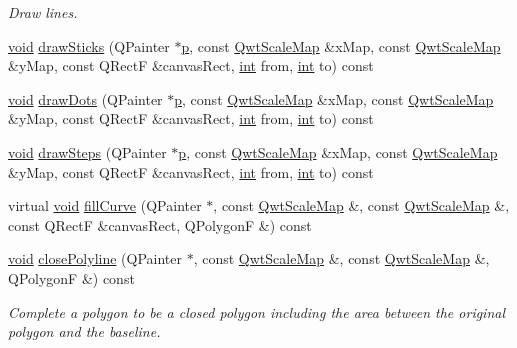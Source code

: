 \begin{DoxyCompactItemize}
\begin{DoxyCompactList}\small\item\em Draw lines. \end{DoxyCompactList}\item 
\hyperlink{group___u_a_v_objects_plugin_ga444cf2ff3f0ecbe028adce838d373f5c}{void} \hyperlink{class_qwt_plot_curve_a732c4a8b905be4f635d8558b6d959b52}{draw\-Sticks} (Q\-Painter $\ast$\hyperlink{glext_8h_aa5367c14d90f462230c2611b81b41d23}{p}, const \hyperlink{class_qwt_scale_map}{Qwt\-Scale\-Map} \&x\-Map, const \hyperlink{class_qwt_scale_map}{Qwt\-Scale\-Map} \&y\-Map, const Q\-Rect\-F \&canvas\-Rect, \hyperlink{ioapi_8h_a787fa3cf048117ba7123753c1e74fcd6}{int} from, \hyperlink{ioapi_8h_a787fa3cf048117ba7123753c1e74fcd6}{int} to) const 
\item 
\hyperlink{group___u_a_v_objects_plugin_ga444cf2ff3f0ecbe028adce838d373f5c}{void} \hyperlink{class_qwt_plot_curve_a9d5c81d3340aebf2ab8cf0dfee7e9c81}{draw\-Dots} (Q\-Painter $\ast$\hyperlink{glext_8h_aa5367c14d90f462230c2611b81b41d23}{p}, const \hyperlink{class_qwt_scale_map}{Qwt\-Scale\-Map} \&x\-Map, const \hyperlink{class_qwt_scale_map}{Qwt\-Scale\-Map} \&y\-Map, const Q\-Rect\-F \&canvas\-Rect, \hyperlink{ioapi_8h_a787fa3cf048117ba7123753c1e74fcd6}{int} from, \hyperlink{ioapi_8h_a787fa3cf048117ba7123753c1e74fcd6}{int} to) const 
\item 
\hyperlink{group___u_a_v_objects_plugin_ga444cf2ff3f0ecbe028adce838d373f5c}{void} \hyperlink{class_qwt_plot_curve_aa55bd22c153a15b7cba082c499536602}{draw\-Steps} (Q\-Painter $\ast$\hyperlink{glext_8h_aa5367c14d90f462230c2611b81b41d23}{p}, const \hyperlink{class_qwt_scale_map}{Qwt\-Scale\-Map} \&x\-Map, const \hyperlink{class_qwt_scale_map}{Qwt\-Scale\-Map} \&y\-Map, const Q\-Rect\-F \&canvas\-Rect, \hyperlink{ioapi_8h_a787fa3cf048117ba7123753c1e74fcd6}{int} from, \hyperlink{ioapi_8h_a787fa3cf048117ba7123753c1e74fcd6}{int} to) const 
\item 
virtual \hyperlink{group___u_a_v_objects_plugin_ga444cf2ff3f0ecbe028adce838d373f5c}{void} \hyperlink{class_qwt_plot_curve_a599d88770d6fafa5ae4edb75fd5d445f}{fill\-Curve} (Q\-Painter $\ast$, const \hyperlink{class_qwt_scale_map}{Qwt\-Scale\-Map} \&, const \hyperlink{class_qwt_scale_map}{Qwt\-Scale\-Map} \&, const Q\-Rect\-F \&canvas\-Rect, Q\-Polygon\-F \&) const 
\item 
\hyperlink{group___u_a_v_objects_plugin_ga444cf2ff3f0ecbe028adce838d373f5c}{void} \hyperlink{class_qwt_plot_curve_abada791559395b278f9dc4478dffcc6f}{close\-Polyline} (Q\-Painter $\ast$, const \hyperlink{class_qwt_scale_map}{Qwt\-Scale\-Map} \&, const \hyperlink{class_qwt_scale_map}{Qwt\-Scale\-Map} \&, Q\-Polygon\-F \&) const 
\begin{DoxyCompactList}\small\item\em Complete a polygon to be a closed polygon including the area between the original polygon and the baseline. \end{DoxyCompactList}\end{DoxyCompactItemize}
